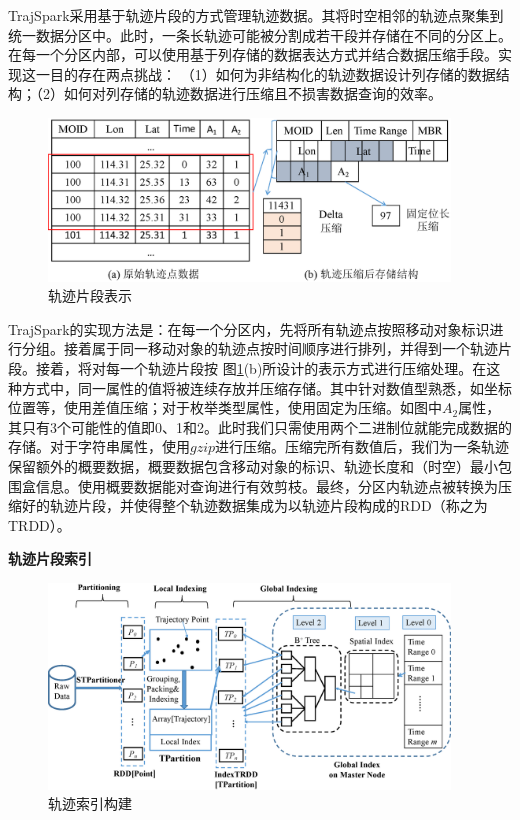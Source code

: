 	TrajSpark采用基于轨迹片段的方式管理轨迹数据。其将时空相邻的轨迹点聚集到统一数据分区中。此时，一条长轨迹可能被分割成若干段并存储在不同的分区上。在每一个分区内部，可以使用基于列存储的数据表达方式并结合数据压缩手段。实现这一目的存在两点挑战：
	（1）如何为非结构化的轨迹数据设计列存储的数据结构；（2）如何对列存储的轨迹数据进行压缩且不损害数据查询的效率。
	\begin{figure}
		\centering
		\includegraphics[width=0.95\textwidth]{Fig/chapter3/compress.eps}
		\caption{轨迹片段表示}
		\label{fig:TrajFormat}
	\end{figure}
	
	TrajSpark的实现方法是：在每一个分区内，先将所有轨迹点按照移动对象标识进行分组。接着属于同一移动对象的轨迹点按时间顺序进行排列，并得到一个轨迹片段。接着，将对每一个轨迹片段按
	图\ref{fig:TrajFormat}(b)所设计的表示方式进行压缩处理。在这种方式中，同一属性的值将被连续存放并压缩存储。其中针对数值型熟悉，如坐标位置等，使用差值压缩；对于枚举类型属性，使用固定为压缩。如图中$A_{2}$属性，其只有3个可能性的值即0、1和2。此时我们只需使用两个二进制位就能完成数据的存储。对于字符串属性，使用$gzip$进行压缩。压缩完所有数值后，我们为一条轨迹保留额外的概要数据，概要数据包含移动对象的标识、轨迹长度和（时空）最小包围盒信息。使用概要数据能对查询进行有效剪枝。最终，分区内轨迹点被转换为压缩好的轨迹片段，并使得整个轨迹数据集成为以轨迹片段构成的RDD（称之为TRDD）。
	
\textbf{轨迹片段索引}
	
	\begin{figure}[t]
		\centering
		\includegraphics[width=0.95\textwidth]{Fig/chapter3/indexConstruct.eps}
		\caption{轨迹索引构建}
		\label{fig:index}
	\end{figure}
	
